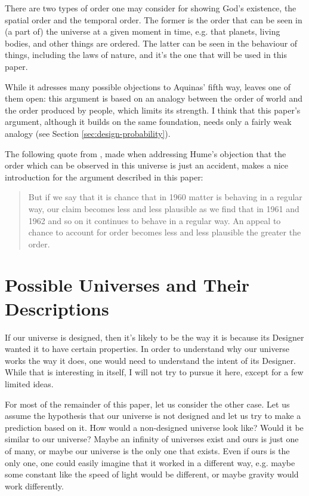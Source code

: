 \documentclass[a4paper
]{article}
\newcommand{\paper}[1]{paper}
\begin{document}
There are two types of order one may consider for showing God's existence,
the spatial order and the temporal order.
The former is the order that can be seen in (a part of) the universe
at a given moment in time, e.g. that planets, living bodies, and other things
are ordered.
The latter can be seen in the behaviour of things, including the laws of
nature, and it's the one that will be used in this \paper{}.

While it adresses many possible objections to Aquinas' fifth way,
 leaves one of them open:
this argument is based on an analogy between the order of world and the order
produced by people, which limits its strength.
I think that this \paper{}'s argument, although it builds on the same
foundation, needs only a fairly weak analogy
(see Section \ref{sec:design-probability}).

The following quote from \textcite{swinburne1968}, made when addressing
Hume's objection that the order which can be observed in this universe
is just an accident, makes a nice introduction for the argument
described in this \paper{}:
\begin{quote}
But if we say that it is chance that in 1960 matter is behaving in a
regular way, our claim becomes less and less plausible as we find that in
1961 and 1962 and so on it continues to behave in a regular way. An appeal
to chance to account for order becomes less and less plausible
the greater the order.
\end{quote}


\section{Possible Universes and Their Descriptions}
\label{sec:possible-universes}

If our universe is designed, then it's likely to be the way it is because
its Designer wanted it to have certain properties.
In order to understand why our universe works the way it does,
one would need to understand the intent of its Designer.
While that is interesting in itself, I will not try to pursue it here,
except for a few limited ideas.

For most of the remainder of this \paper{}, let us consider the other case.
Let us assume the hypothesis that our universe is not designed
and let us try to make a prediction based on it.
How would a non-designed universe look like?
Would it be similar to our universe?
Maybe an infinity of universes exist and ours is just one of many,
or maybe our universe is the only one that exists.
Even if ours is the only one, one could easily imagine that it worked
in a different way, e.g. maybe some constant like the speed of light would be
different, or maybe gravity would work differently.
\end{document}
